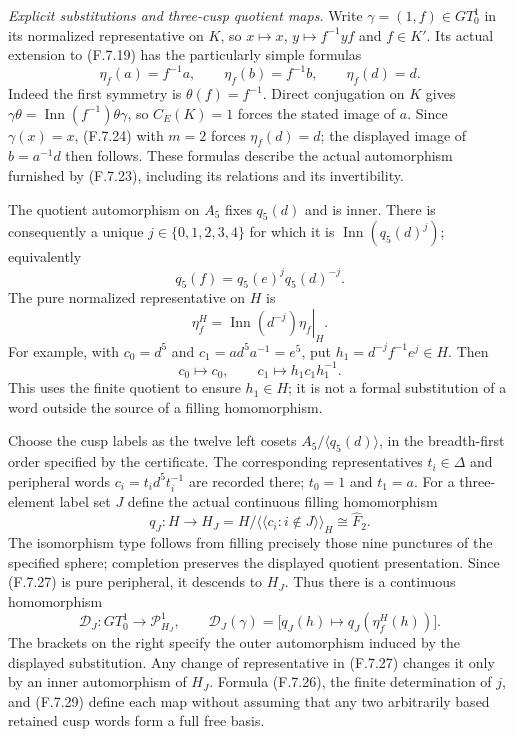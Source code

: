 \emph{Explicit substitutions and three-cusp quotient maps.}
Write $\gamma=(1,f)\in GT_0^1$ in its normalized
representative on $K$, so
$x\mapsto x$, $y\mapsto f^{-1}yf$ and $f\in K'$.
Its actual extension to (F.7.19) has the particularly
simple formulas
\[
          \eta_f(a)=f^{-1}a,\qquad
          \eta_f(b)=f^{-1}b,\qquad \eta_f(d)=d .         \tag{F.7.26}
\]
Indeed the first symmetry is $\theta(f)=f^{-1}$.
Direct conjugation on $K$ gives
$\gamma\theta=\operatorname{Inn}(f^{-1})\theta\gamma$,
so $C_E(K)=1$ forces the stated image of $a$.
Since $\gamma(x)=x$, (F.7.24) with $m=2$ forces
$\eta_f(d)=d$; the displayed image of $b=a^{-1}d$
then follows.  These formulas describe the actual
automorphism furnished by (F.7.23), including its
relations and its invertibility.

The quotient automorphism on $A_5$ fixes $q_5(d)$
and is inner.  There is consequently a unique
$j\in\{0,1,2,3,4\}$ for which it is
$\operatorname{Inn}(q_5(d)^j)$; equivalently
\[
             q_5(f)=q_5(e)^j q_5(d)^{-j}.
\]
The pure normalized representative on $H$ is
\[
       \eta_f^H=
          \left.\operatorname{Inn}(d^{-j})\eta_f\right|_H.
                                                               \tag{F.7.27}
\]
For example, with $c_0=d^5$ and $c_1=a d^5a^{-1}=e^5$,
put $h_1=d^{-j}f^{-1}e^j\in H$.  Then
\[
                 c_0\longmapsto c_0,
        \qquad c_1\longmapsto h_1c_1h_1^{-1}.           \tag{F.7.28}
\]
This uses the finite quotient to ensure $h_1\in H$;
it is not a formal substitution of a word outside
the source of a filling homomorphism.

Choose the cusp labels as the twelve left cosets
$A_5/\langle q_5(d)\rangle$, in the breadth-first
order specified by the certificate.  The corresponding
representatives $t_i\in\Delta$ and peripheral words
$c_i=t_i d^5t_i^{-1}$ are recorded there; $t_0=1$
and $t_1=a$.
For a three-element label set $J$ define the actual
continuous filling homomorphism
\[
 q_J:H\longrightarrow H_J
     =H/\langle\!\langle c_i:i\notin J\rangle\!\rangle_H
                         \cong\widehat F_2.            \tag{F.7.29}
\]
The isomorphism type follows from filling precisely
those nine punctures of the specified sphere;
completion preserves the displayed quotient
presentation.  Since (F.7.27) is pure peripheral,
it descends to $H_J$.  Thus there is a continuous
homomorphism
\[
 \mathcal D_J:GT_0^1\longrightarrow\mathcal P_{H_J}^1,
 \qquad\mathcal D_J(\gamma)=
 \bigl[q_J(h)\longmapsto q_J(\eta_f^H(h))\bigr].       \tag{F.7.30}
\]
The brackets on the right specify the outer
automorphism induced by the displayed substitution.
Any change of representative in (F.7.27) changes
it only by an inner automorphism of $H_J$.
Formula (F.7.26), the finite determination of $j$,
and (F.7.29) define each map without assuming that
any two arbitrarily based retained cusp words
form a full free basis.

